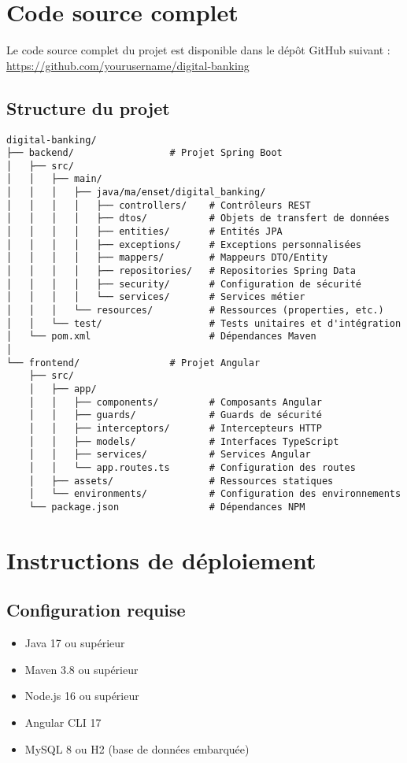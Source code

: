 \documentclass[12pt,a4paper]{report}
\begin{document}
\appendix
\chapter{Code source complet}

Le code source complet du projet est disponible dans le dépôt GitHub suivant :
\url{https://github.com/yourusername/digital-banking}

\section{Structure du projet}

\begin{verbatim}
digital-banking/
├── backend/                 # Projet Spring Boot
│   ├── src/
│   │   ├── main/
│   │   │   ├── java/ma/enset/digital_banking/
│   │   │   │   ├── controllers/    # Contrôleurs REST
│   │   │   │   ├── dtos/           # Objets de transfert de données
│   │   │   │   ├── entities/       # Entités JPA
│   │   │   │   ├── exceptions/     # Exceptions personnalisées
│   │   │   │   ├── mappers/        # Mappeurs DTO/Entity
│   │   │   │   ├── repositories/   # Repositories Spring Data
│   │   │   │   ├── security/       # Configuration de sécurité
│   │   │   │   └── services/       # Services métier
│   │   │   └── resources/          # Ressources (properties, etc.)
│   │   └── test/                   # Tests unitaires et d'intégration
│   └── pom.xml                     # Dépendances Maven
│
└── frontend/                # Projet Angular
    ├── src/
    │   ├── app/
    │   │   ├── components/         # Composants Angular
    │   │   ├── guards/             # Guards de sécurité
    │   │   ├── interceptors/       # Intercepteurs HTTP
    │   │   ├── models/             # Interfaces TypeScript
    │   │   ├── services/           # Services Angular
    │   │   └── app.routes.ts       # Configuration des routes
    │   ├── assets/                 # Ressources statiques
    │   └── environments/           # Configuration des environnements
    └── package.json                # Dépendances NPM
\end{verbatim}

\chapter{Instructions de déploiement}

\section{Configuration requise}
\begin{itemize}
    \item Java 17 ou supérieur
    \item Maven 3.8 ou supérieur
    \item Node.js 16 ou supérieur
    \item Angular CLI 17
    \item MySQL 8 ou H2 (base de données embarquée)
\end{itemize}
\end{document}
